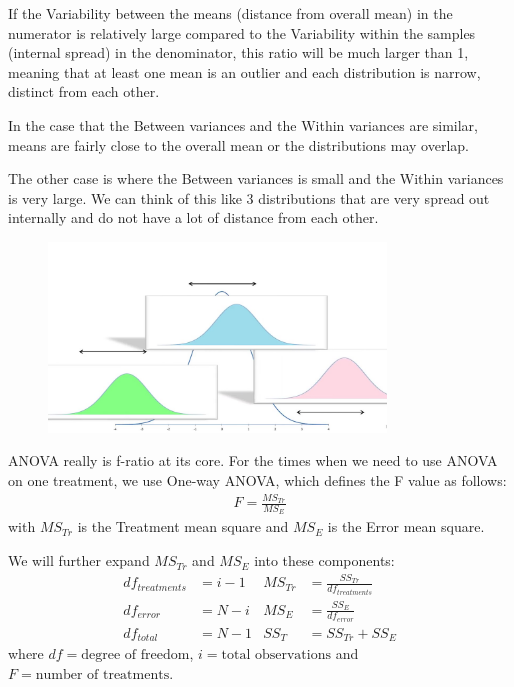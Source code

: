 \documentclass[a4paper]{article}
\numberwithin{equation}{section}
\begin{document}
If the Variability between the means (distance from overall mean) in the numerator is relatively large compared to the Variability within the samples (internal spread) in the denominator, this ratio will be much larger than 1, meaning that at least one mean is an outlier and each distribution is narrow, distinct from each other.

In the case that the Between variances and the Within variances are similar, means are fairly close to the overall mean or the distributions may overlap.

The other case is where the Between variances is small and the Within variances is very large.
We can think of this like 3 distributions that are very spread out internally and do not have a lot of distance from each other.
\begin{figure}[H]
  \centering
  \includegraphics[width=0.8\textwidth]{anova.jpg}
\end{figure}

ANOVA really is f-ratio at its core.
For the times when we need to use ANOVA on one treatment, we use One-way ANOVA, which defines the F value as follows:
\begin{align*}
  F = \frac{MS_{Tr}}{MS_{E}}
\end{align*}
with \(MS_{Tr}\) is the Treatment mean square and \(MS_{E}\) is the Error mean square.

We will further expand \(MS_{Tr}\) and \(MS_{E}\) into these components:
\begin{align*}
  df_{treatments} & = i - 1 & MS_{Tr} & = \frac{SS_{Tr}}{df_{treatments}} \\
  df_{error}      & = N - i & MS_{E}  & = \frac{SS_{E}}{df_{error}}       \\
  df_{total}      & = N - 1 & SS_{T}  & = SS_{Tr} + SS_{E}
\end{align*}
where \(df = \text{degree of freedom}\), \(i = \text{total observations}\) and \(F = \text{number of treatments}\).
\end{document}
